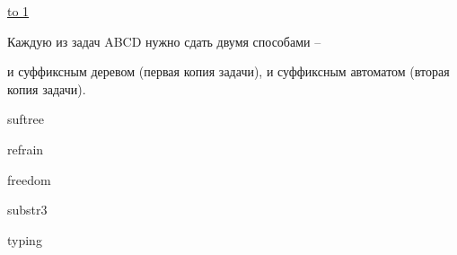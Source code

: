 \documentclass[12pt,a4paper,oneside]{article}
\newcommand{\ProblemLabel}{undefined}
\newcommand{\ProblemTL}{undefined}
\newcommand{\ProblemML}{undefined}
\newcommand{\ProblemName}{undefined}
\def\probl#1#2#3#4#5{
  \renewcommand{\ProblemName}{#2}
  \renewcommand{\ProblemLabel}{#3}
  \renewcommand{\ProblemTL}{#4}
  \renewcommand{\ProblemML}{#5}
  {#2}
}
\begin{document}
\vspace*{-2em}
\tableofcontents

\vspace*{1em}

\noindent \underline{\hbox to 1\textwidth{{ } \hfil{ } \hfil{ } }}

\vspace*{1em}

Каждую из задач ABCD нужно сдать двумя способами -- 

и суффиксным деревом (первая копия задачи), и суффиксным автоматом (вторая копия задачи).

\pagebreak

\probl{2015-04}{suftree}{A}{0.5 sec}{256 mb} %
\probl{2011-05}{refrain}{B}{0.5 sec}{256 mb} %
\probl{2015-04}{freedom}{C}{0.5 sec}{256 mb} %
\probl{2012-01}{substr3}{D}{0.5 sec}{256 mb} %
\probl{2015-02}{typing}{E}{0.5 sec}{256 mb}  %
\end{document}
